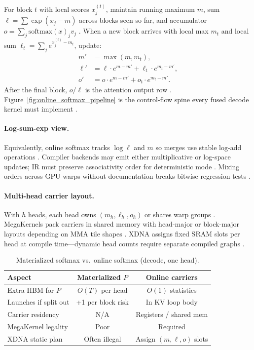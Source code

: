 For block $t$ with local scores $x^{(t)}_j$, maintain running maximum $m$, sum $\ell=\sum \exp(x_j-m)$ across blocks seen so far, and accumulator $o=\sum_j \mathrm{softmax}(x)_j v_j$ \citep{dao2022flashattention}. When a new block arrives with local max $m_t$ and local sum $\ell_t=\sum_j e^{x^{(t)}_j-m_t}$, update:
\begin{align*}
m' &= \max(m, m_t), \\
\ell' &= \ell \cdot e^{m-m'} + \ell_t \cdot e^{m_t-m'}, \\
o' &= o \cdot e^{m-m'} + o_t \cdot e^{m_t-m'}.
\end{align*}
After the final block, $o/\ell$ is the attention output row \citep{dao2022flashattention,dao2023flashdecoding}. Figure~\ref{fig:online_softmax_pipeline} is the control-flow spine every fused decode kernel must implement \citep{yirage2026,chen2020compilerbasedhardw}.

\paragraph{Log-sum-exp view.} Equivalently, online softmax tracks $\log \ell$ and $m$ so merges use stable log-add operations \citep{dlbook}. Compiler backends may emit either multiplicative or log-space updates; IR must preserve associativity order for deterministic mode \citep{yirage2026,chen2020compilerbasedhardw}. Mixing orders across GPU warps without documentation breaks bitwise regression tests \citep{patel2025llminference}.

\paragraph{Multi-head carrier layout.} With $h$ heads, each head owns $(m_h,\ell_h,o_h)$ or shares warp groups \citep{dao2022flashattention}. MegaKernels pack carriers in shared memory with head-major or block-major layouts depending on MMA tile shapes \citep{semianalysis2024tma,nvidia2022hopper}. XDNA assigns fixed SRAM slots per head at compile time---dynamic head counts require separate compiled graphs \citep{amd2024aie,amd2024xdna}.

\begin{table}[t]
\centering
\caption{Materialized softmax vs.\ online softmax (decode, one head).}
\label{tab:online_softmax}
\begin{tabular}{lcc}
\toprule
\textbf{Aspect} & \textbf{Materialized $P$} & \textbf{Online carriers} \\
\midrule
Extra HBM for $P$ & $O(T)$ per head & $O(1)$ statistics \\
Launches if split out & +1 per block risk & In KV loop body \\
Carrier residency & N/A & Registers / shared mem \\
MegaKernel legality & Poor & Required \\
XDNA static plan & Often illegal & Assign $(m,\ell,o)$ slots \\
\bottomrule
\end{tabular}
\end{table}

